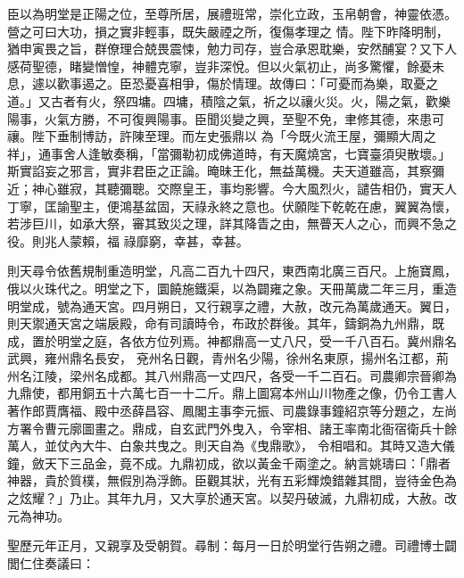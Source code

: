 \begin{pinyinscope}
 臣以為明堂是正陽之位，至尊所居，展禮班常，崇化立政，玉帛朝會，神靈依憑。營之可曰大功，損之實非輕事，既失嚴禋之所，復傷孝理之
 情。陛下昨降明制，猶申寅畏之旨，群僚理合兢畏震悚，勉力司存，豈合承恩耽樂，安然酺宴？又下人感荷聖德，睹變憎惶，神體克寧，豈非深悅。但以火氣初止，尚多驚懼，餘憂未息，遽以歡事遏之。臣恐憂喜相爭，傷於情理。故傳曰：「可憂而為樂，取憂之道。」又古者有火，祭四墉。四墉，積陰之氣，祈之以禳火災。火，陽之氣，歡樂陽事，火氣方勝，不可復興陽事。臣聞災變之興，至聖不免，聿修其德，來患可禳。陛下垂制博訪，許陳至理。而左史張鼎以
 為「今既火流王屋，彌顯大周之祥」，通事舍人逢敏奏稱，「當彌勒初成佛道時，有天魔燒宮，七寶臺須臾散壞。」斯實諂妄之邪言，實非君臣之正論。晻昧王化，無益萬機。夫天道雖高，其察彌近；神心雖寂，其聽彌聰。交際皇王，事均影響。今大風烈火，譴告相仍，實天人丁寧，匡諭聖主，便鴻基盆固，天祿永終之意也。伏願陛下乾乾在慮，翼翼為懷，若涉巨川，如承大祭，審其致災之理，詳其降眚之由，無瞢天人之心，而興不急之役。則兆人蒙賴，福
 祿靡窮，幸甚，幸甚。



 則天尋令依舊規制重造明堂，凡高二百九十四尺，東西南北廣三百尺。上施寶鳳，俄以火珠代之。明堂之下，圜饒施鐵渠，以為闢雍之象。天冊萬歲二年三月，重造明堂成，號為通天宮。四月朔日，又行親享之禮，大赦，改元為萬歲通天。翼日，則天禦通天宮之端扆殿，命有司讀時令，布政於群後。其年，鑄銅為九州鼎，既成，置於明堂之庭，各依方位列焉。神都鼎高一丈八尺，受一千八百石。冀州鼎名武興，雍州鼎名長安，
 兗州名日觀，青州名少陽，徐州名東原，揚州名江都，荊州名江陵，梁州名成都。其八州鼎高一丈四尺，各受一千二百石。司農卿宗晉卿為九鼎使，都用銅五十六萬七百一十二斤。鼎上圖寫本州山川物產之像，仍令工書人著作郎賈膺福、殿中丞薛昌容、鳳閣主事李元振、司農錄事鐘紹京等分題之，左尚方署令曹元廓圖畫之。鼎成，自玄武門外曳入，令宰相、諸王率南北衙宿衛兵十餘萬人，並仗內大牛、白象共曳之。則天自為《曳鼎歌》，
 令相唱和。其時又造大儀鐘，斂天下三品金，竟不成。九鼎初成，欲以黃金千兩塗之。納言姚璹曰：「鼎者神器，貴於質樸，無假別為浮飾。臣觀其狀，光有五彩輝煥錯雜其間，豈待金色為之炫耀？」乃止。其年九月，又大享於通天宮。以契丹破滅，九鼎初成，大赦。改元為神功。



 聖歷元年正月，又親享及受朝賀。尋制：每月一日於明堂行告朔之禮。司禮博士闢閭仁住奏議曰：




\end{pinyinscope}
